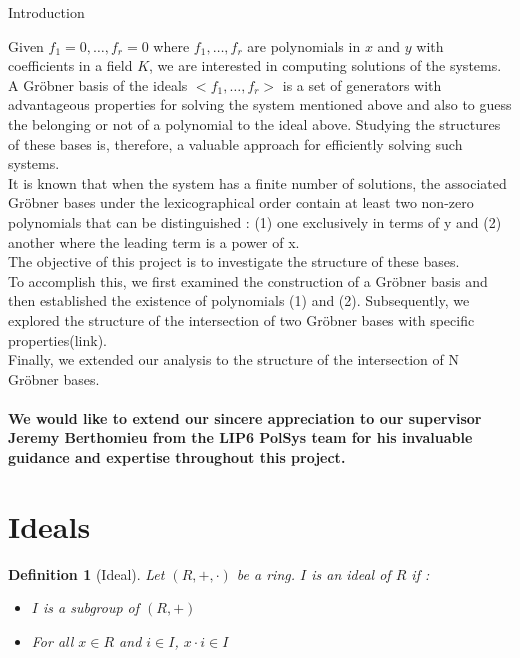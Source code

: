 \documentclass{article}
\newtheorem{definition}{Definition}[section]
\begin{document}
\begin{center}
    
\LARGE{Introduction\\}
\end{center}
Given $f_{1}=0,\dots,f_{r}=0$ where $f_{1},\dots,f_{r}$ are polynomials in $x$ and $y$ with coefficients in a field $K$, we are interested in computing solutions of the systems. A Gröbner basis of the ideals $<f_{1},\dots,f_{r}>$ is a set of generators with advantageous properties for solving the system mentioned above and also to guess the belonging or not of a polynomial to the ideal above. Studying the structures of these bases is, therefore, a valuable approach for efficiently solving such systems. \\
It is known that when the system has a finite number of solutions, the associated Gröbner bases under the lexicographical order contain at least two non-zero polynomials that can be distinguished : (1) one exclusively in terms of y and (2) another where the leading term is a power of x. \\
The objective of this project is to investigate the structure of these bases. \\
To accomplish this, we first examined the construction of a Gröbner basis and then established the existence of polynomials (1) and (2). Subsequently, we explored the structure of the intersection of two Gröbner bases with specific properties(link). \\
Finally, we extended our analysis to the structure of the intersection of N Gröbner bases. \\ \\

\textbf{We would like to extend our sincere appreciation to our supervisor Jeremy Berthomieu from the LIP6 PolSys  team for his invaluable guidance and expertise throughout this project.}

\newpage      

\section{Ideals}

\begin{definition}[Ideal]
    Let $(R, +, \cdot)$ be a ring. $I$ is an ideal of $R$ if : 
    \begin{itemize}
        \item $I$ is a subgroup of $(R, +)$
        \item For all $x \in R$ and $i \in I$, $x \cdot i \in I$
    \end{itemize}
\end{definition}
\end{document}
